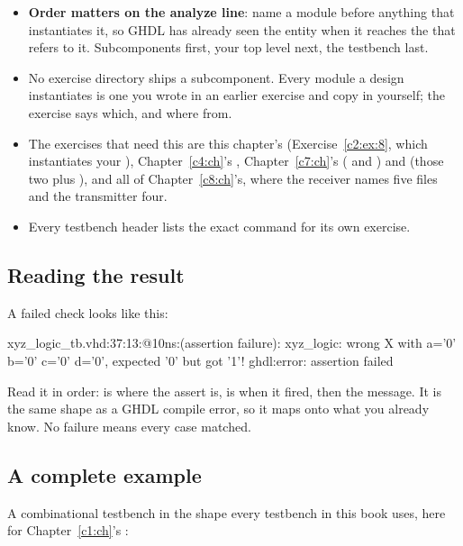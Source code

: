 \begin{itemize}
  \item \textbf{Order matters on the analyze line}: name a module before anything that instantiates
    it, so GHDL has already seen the entity when it reaches the  that
    refers to it. Subcomponents first, your top level next, the testbench last.
  \item No exercise directory ships a subcomponent. Every module a design instantiates is one you
    wrote in an earlier exercise and copy in yourself; the exercise says which, and where from.
  \item The exercises that need this are this chapter's 
    (Exercise~\ref{c2:ex:8}, which instantiates your ), Chapter~\ref{c4:ch}'s
    , Chapter~\ref{c7:ch}'s  ( and
    ) and  (those two plus ), and all of
    Chapter~\ref{c8:ch}'s, where the receiver names five files and the transmitter four.
  \item Every testbench header lists the exact command for its own exercise.
\end{itemize}

\subsection{Reading the result}
\label{c2:c6}
A failed check looks like this:

\begin{console}
xyz_logic_tb.vhd:37:13:@10ns:(assertion failure): xyz_logic: wrong X with a='0' b='0' c='0' d='0', expected '0' but got '1'!
ghdl:error: assertion failed
\end{console}

\noindent Read it in order:  is where the assert is,  is when it fired,
then the message. It is the same shape as a GHDL compile error, so it maps onto what you already
know. No failure means every case matched.

\subsection{A complete example}
\label{c2:c7}
A combinational testbench in the shape every testbench in this book uses, here for
Chapter~\ref{c1:ch}'s :

